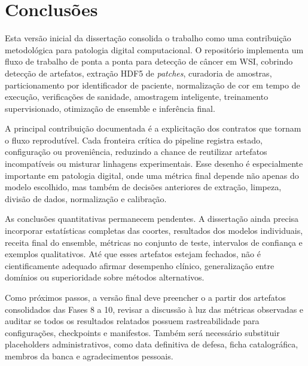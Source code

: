 \chapter{Conclusões}\label{chp:conclusoes}

Esta versão inicial da dissertação consolida o trabalho como uma contribuição metodológica para patologia digital computacional. O repositório implementa um fluxo de trabalho de ponta a ponta para detecção de câncer em WSI, cobrindo detecção de artefatos, extração HDF5 de \textit{patches}, curadoria de amostras, particionamento por identificador de paciente, normalização de cor em tempo de execução, verificações de sanidade, amostragem inteligente, treinamento supervisionado, otimização de ensemble e inferência final.

A principal contribuição documentada é a explicitação dos contratos que tornam o fluxo reprodutível. Cada fronteira crítica do pipeline registra estado, configuração ou proveniência, reduzindo a chance de reutilizar artefatos incompatíveis ou misturar linhagens experimentais. Esse desenho é especialmente importante em patologia digital, onde uma métrica final depende não apenas do modelo escolhido, mas também de decisões anteriores de extração, limpeza, divisão de dados, normalização e calibração.

As conclusões quantitativas permanecem pendentes. A dissertação ainda precisa incorporar estatísticas completas das coortes, resultados dos modelos individuais, receita final do ensemble, métricas no conjunto de teste, intervalos de confiança e exemplos qualitativos. Até que esses artefatos estejam fechados, não é cientificamente adequado afirmar desempenho clínico, generalização entre domínios ou superioridade sobre métodos alternativos.

Como próximos passos, a versão final deve preencher o  a partir dos artefatos consolidados das Fases 8 a 10, revisar a discussão à luz das métricas observadas e auditar se todos os resultados relatados possuem rastreabilidade para configurações, checkpoints e manifestos. Também será necessário substituir placeholders administrativos, como data definitiva de defesa, ficha catalográfica, membros da banca e agradecimentos pessoais.
